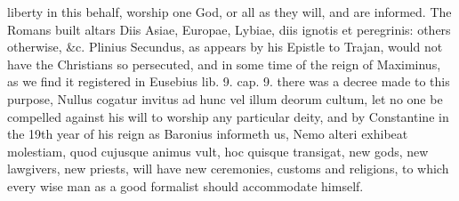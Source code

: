 {liberty in this behalf, worship one God, or all as they will, and are
informed. The Romans built altars Diis Asiae, Europae, Lybiae, diis
ignotis et peregrinis: others otherwise, \&c. Plinius Secundus, as
appears by his Epistle to Trajan, would not have the Christians so
persecuted, and in some time of the reign of Maximinus, as we find it
registered in Eusebius lib. 9. cap. 9. there was a decree made to this
purpose, Nullus cogatur invitus ad hunc vel illum deorum cultum, let no
one be compelled against his will to worship any particular deity, and
by Constantine in the 19th year of his reign as Baronius
informeth us, Nemo alteri exhibeat molestiam, quod cujusque animus
vult, hoc quisque transigat, new gods, new lawgivers, new priests, will
have new ceremonies, customs and religions, to which every wise man as
a good formalist should accommodate himself.


}
